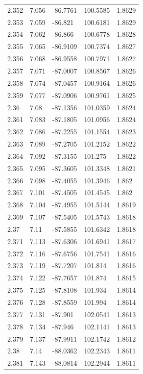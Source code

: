 \begin{tabular}{lllll}
2.352 & 7.056 & -86.7761 & 100.5585 & 1.8629 \\
2.353 & 7.059 & -86.821 & 100.6181 & 1.8629 \\
2.354 & 7.062 & -86.866 & 100.6778 & 1.8628 \\
2.355 & 7.065 & -86.9109 & 100.7374 & 1.8627 \\
2.356 & 7.068 & -86.9558 & 100.7971 & 1.8627 \\
2.357 & 7.071 & -87.0007 & 100.8567 & 1.8626 \\
2.358 & 7.074 & -87.0457 & 100.9164 & 1.8626 \\
2.359 & 7.077 & -87.0906 & 100.9761 & 1.8625 \\
2.36 & 7.08 & -87.1356 & 101.0359 & 1.8624 \\
2.361 & 7.083 & -87.1805 & 101.0956 & 1.8624 \\
2.362 & 7.086 & -87.2255 & 101.1554 & 1.8623 \\
2.363 & 7.089 & -87.2705 & 101.2152 & 1.8622 \\
2.364 & 7.092 & -87.3155 & 101.275 & 1.8622 \\
2.365 & 7.095 & -87.3605 & 101.3348 & 1.8621 \\
2.366 & 7.098 & -87.4055 & 101.3946 & 1.862 \\
2.367 & 7.101 & -87.4505 & 101.4545 & 1.862 \\
2.368 & 7.104 & -87.4955 & 101.5144 & 1.8619 \\
2.369 & 7.107 & -87.5405 & 101.5743 & 1.8618 \\
2.37 & 7.11 & -87.5855 & 101.6342 & 1.8618 \\
2.371 & 7.113 & -87.6306 & 101.6941 & 1.8617 \\
2.372 & 7.116 & -87.6756 & 101.7541 & 1.8616 \\
2.373 & 7.119 & -87.7207 & 101.814 & 1.8616 \\
2.374 & 7.122 & -87.7657 & 101.874 & 1.8615 \\
2.375 & 7.125 & -87.8108 & 101.934 & 1.8614 \\
2.376 & 7.128 & -87.8559 & 101.994 & 1.8614 \\
2.377 & 7.131 & -87.901 & 102.0541 & 1.8613 \\
2.378 & 7.134 & -87.946 & 102.1141 & 1.8613 \\
2.379 & 7.137 & -87.9911 & 102.1742 & 1.8612 \\
2.38 & 7.14 & -88.0362 & 102.2343 & 1.8611 \\
2.381 & 7.143 & -88.0814 & 102.2944 & 1.8611 \\

\end{tabular}
